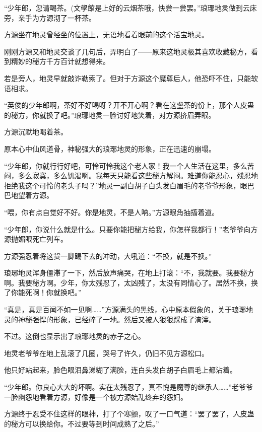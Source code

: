 
\begin{this_body}

“少年郎，您请喝茶。(文學館是上好的云烟茶哦，快尝一尝罢。”琅琊地灵做到云床旁，亲手为方源沏了一杯茶。

方源坐在地灵曾经坐的位置上，无语地看着眼前的这个活宝地灵。

刚刚方源又和地灵交谈了几句后，弄明白了——原来这地灵极其喜欢收藏秘方，看到精妙的秘方千方百计就想得来。

若是旁人，地灵早就敲诈勒索了。但对于方源这个魔尊后人，他恐吓不住，只能软语相求。

“英俊的少年郎啊，茶好不好喝呀？开不开心啊？看在这盏茶的份上，那个人皮蛊的秘方，你就换了吧。”琅琊地灵一脸讨好地笑着，对方源挤眉弄眼。

方源沉默地喝着茶。

原本心中仙风道骨，神秘强大的琅琊地灵的形象，正在迅速的崩塌。

“少年郎，你就行行好吧，可怜可怜我这个老人家！我一个人生活在这里，多么苦闷，多么寂寞，多么饥渴啊。我每天只能看这些秘方解闷。难道你能忍心，残忍地拒绝我这个可怜的老头子吗？”地灵一副白胡子白头发白眉毛的老爷爷形象，眼巴巴地望着方源。

“喂，你有点自觉好不好。你是地灵，不是人呐。”方源眼角抽搐着道。

“少年郎，你说什么就是什么。只要你能把秘方给我，你怎样我都行！”老爷爷向方源抛媚眼死亡列车。

方源强忍着将这货一脚踢下去的冲动，大吼道：“不换，就是不换。”

琅琊地灵浑身僵滞了一下，然后放声痛哭，在地上打滚：“不，我就要。我要秘方啊。我要秘方啊。少年，你太残忍了，太凶残了，太没有同情心了。居然不换，换了你能死啊！你就换吧。”

“真是，真是百闻不如一见啊……”方源满头的黑线，心中原本假象的，关于琅琊地灵的神秘强悍的形象，已经碎了一地。然后又被人狠狠踩成了渣滓。

不过。这倒也显示出了琅琊地灵的赤子之心。

地灵老爷爷在地上乱滚了几圈，哭号了许久，仍旧不见方源松口。

他只好站起来，脸色眼泪鼻涕糊了满脸，连白头发白胡子白眉毛上都沾着。

“少年郎。你良心大大的坏啊。实在太残忍了，真不愧是魔尊的继承人……”老爷爷一脸幽怨地看着方源，好像是一个被方源始乱终弃的怨妇。

方源终于忍受不住这样的眼神，打了个寒颤，叹了一口气道：“罢了罢了，人皮蛊的秘方可以换给你。不过要等到时间成熟了之后。”


\end{this_body}
